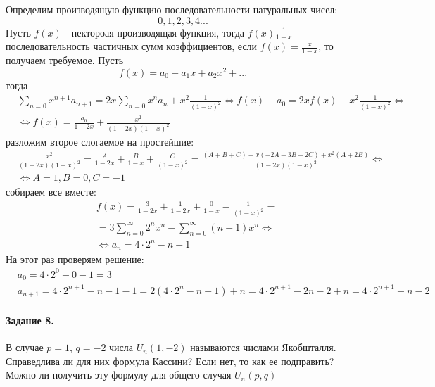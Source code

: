 \documentclass[a4paper,12pt]{article}
\begin{document}
\begin{Solution}
Определим производящую функцию последовательности натуральных чисел:
\[
	0, 1, 2, 3, 4 ...
\]
Пусть $f\left(x\right)$ - нектороая производящая функция, тогда $f\left(x\right) \frac{1}{1-x}$ - последовательность частичных сумм коэффициентов, если $f\left(x\right) = \frac{x}{1-x}$, то получаем требуемое.
Пусть
\[
	f\left(x\right) = a_0 + a_1 x + a_2 x^2 + ...
\]
тогда
\[
	\begin{split}
		& \sum_{n=0}x^{n+1} a_{n+1} = 2 x\sum_{n=0}x^n a_n + x^2 \frac{1}{{\left(1-x\right)}^2} \Leftrightarrow f\left(x\right) - a_0 = 2x f\left(x\right) + x^2\frac{1}{{\left(1-x\right)}^2} \Leftrightarrow \\
		& \Leftrightarrow f\left(x\right) = \frac{a_0}{1-2x} + \frac{x^2}{{\left(1-2x\right)\left(1-x\right)}^2}
	\end{split}
\]
разложим второе слогаемое на простейшие:
\[
	\begin{split}
		& \frac{x^2}{\left(1-2x\right){\left(1-x\right)}^2} = \frac{A}{1-2x} + \frac{B}{1-x} + \frac{C}{{\left(1-x\right)}^2} = \frac{\left(A+B+C\right) + x\left(-2A-3B-2C\right) + x^2 \left(A + 2B\right)}{\left(1-2x\right){\left(1-x\right)}^2} \Leftrightarrow \\
		& \Leftrightarrow A = 1, B = 0, C = -1
	\end{split}
\]
собираем все вместе:
\[
	\begin{split}
		& f \left(x\right) = \frac{3}{1-2x} + \frac{1}{1-2x} + \frac{0}{1-x} - \frac{1}{{\left(1-x\right)}^2} = \\
		& = 3\sum_{n=0}^{\infty} 2^n x^n - \sum_{n=0}^{\infty} \left(n+1\right) x^n \Leftrightarrow \\
		& \Leftrightarrow a_n = 4 \cdot 2^n - n - 1
	\end{split}
\]
На этот раз проверяем решение:
\[
	\begin{split}
		& a_0 = 4 \cdot 2^0 - 0 - 1 = 3 \\
		& a_{n+1} = 4 \cdot 2^{n+1} - n - 1 - 1 = 2 \left(4 \cdot 2^n - n - 1\right) + n = 4 \cdot 2^{n+1} - 2n - 2 + n = 4 \cdot 2^{n+1} - n - 2
	\end{split}
\]
\end{Solution}

\paragraph{Задание 8.} В случае $p=1$, $q=-2$ числа $U_n \left(1,-2\right)$ называются числами Якобшталля. Справедлива ли для них формула Кассини? Если нет, то как ее подправить? Можно ли получить эту формулу для общего случая $U_n \left(p,q\right)$
\end{document}
